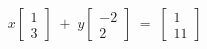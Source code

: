 \documentclass[preview]{standalone}
\begin{document}
\begin{align*}
x\begin{bmatrix}1\\3\end{bmatrix} \;+\;y\begin{bmatrix}-2\\2\end{bmatrix} \;=\;\begin{bmatrix}1\\11\end{bmatrix}
\end{align*}
\end{document}
